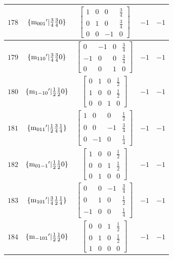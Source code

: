 \documentclass[fleqn,8pt]{jsarticle}
\begin{document}
\begin{longtable}{ccccc}
$ 178 $ & $ \{{\rm m}_{001}{}'|\frac{3}{4} \frac{3}{4} 0\} $ & $ \begin{bmatrix} 1 & 0 & 0 & \frac{3}{4} \\ 0 & 1 & 0 & \frac{3}{4} \\ 0 & 0 & -1 & 0 \end{bmatrix} $ & $ -1 $ & $ -1 $ \\ \hline
$ 179 $ & $ \{{\rm m}_{110}{}'|\frac{3}{4} \frac{3}{4} 0\} $ & $ \begin{bmatrix} 0 & -1 & 0 & \frac{3}{4} \\ -1 & 0 & 0 & \frac{3}{4} \\ 0 & 0 & 1 & 0 \end{bmatrix} $ & $ -1 $ & $ -1 $ \\ \hline
$ 180 $ & $ \{{\rm m}_{1-10}{}'|\frac{1}{2} \frac{1}{2} 0\} $ & $ \begin{bmatrix} 0 & 1 & 0 & \frac{1}{2} \\ 1 & 0 & 0 & \frac{1}{2} \\ 0 & 0 & 1 & 0 \end{bmatrix} $ & $ -1 $ & $ -1 $ \\ \hline
$ 181 $ & $ \{{\rm m}_{011}{}'|\frac{1}{2} \frac{3}{4} \frac{1}{4}\} $ & $ \begin{bmatrix} 1 & 0 & 0 & \frac{1}{2} \\ 0 & 0 & -1 & \frac{3}{4} \\ 0 & -1 & 0 & \frac{1}{4} \end{bmatrix} $ & $ -1 $ & $ -1 $ \\ \hline
$ 182 $ & $ \{{\rm m}_{01-1}{}'|\frac{1}{2} \frac{1}{2} 0\} $ & $ \begin{bmatrix} 1 & 0 & 0 & \frac{1}{2} \\ 0 & 0 & 1 & \frac{1}{2} \\ 0 & 1 & 0 & 0 \end{bmatrix} $ & $ -1 $ & $ -1 $ \\ \hline
$ 183 $ & $ \{{\rm m}_{101}{}'|\frac{3}{4} \frac{1}{2} \frac{1}{4}\} $ & $ \begin{bmatrix} 0 & 0 & -1 & \frac{3}{4} \\ 0 & 1 & 0 & \frac{1}{2} \\ -1 & 0 & 0 & \frac{1}{4} \end{bmatrix} $ & $ -1 $ & $ -1 $ \\ \hline
$ 184 $ & $ \{{\rm m}_{-101}{}'|\frac{1}{2} \frac{1}{2} 0\} $ & $ \begin{bmatrix} 0 & 0 & 1 & \frac{1}{2} \\ 0 & 1 & 0 & \frac{1}{2} \\ 1 & 0 & 0 & 0 \end{bmatrix} $ & $ -1 $ & $ -1 $ \\ \hline

\end{longtable}
\end{document}

